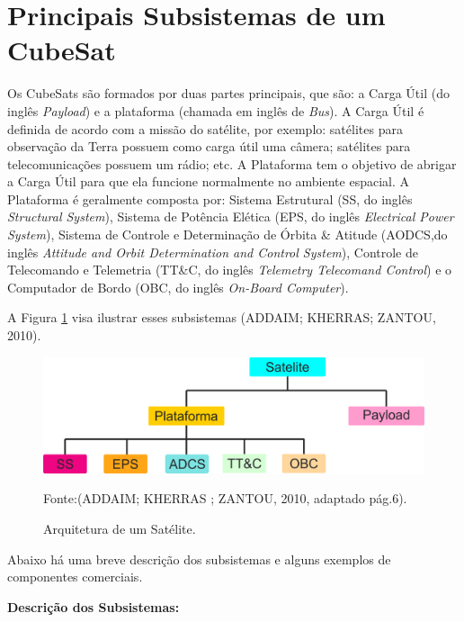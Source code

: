 \section{Principais Subsistemas de um CubeSat}

Os CubeSats são formados por duas partes principais, que são: a Carga Útil (do inglês \textit{Payload}) e a plataforma (chamada em inglês de \textit{Bus}). A Carga Útil é definida de acordo com a missão do satélite, por exemplo: satélites para observação da Terra possuem como carga útil uma câmera; satélites para telecomunicações possuem um rádio; etc. A Plataforma tem o objetivo de abrigar a Carga Útil para que ela funcione normalmente no ambiente espacial. A Plataforma é geralmente composta por: Sistema Estrutural (SS, do inglês \textit{Structural System}), Sistema de Potência Elética (EPS, do inglês \textit{Electrical Power System}), Sistema de Controle e Determinação de Órbita \& Atitude (AODCS,do inglês \textit{Attitude and Orbit Determination and Control System}), Controle de Telecomando e Telemetria (TT\&C, do inglês \textit{Telemetry Telecomand Control}) e o Computador de Bordo (OBC, do inglês \textit{On-Board Computer}). 

\newpage

A Figura \ref{fig06} visa ilustrar esses subsistemas (ADDAIM; KHERRAS; ZANTOU, 2010).

\begin{figure}[h]
	\centering
    \caption{Arquitetura de um Satélite.}
	\includegraphics[keepaspectratio=true,scale=0.57]{figuras/estrutura_satellite.png}
	
	Fonte:(ADDAIM; KHERRAS ; ZANTOU, 2010, adaptado pág.6).
	
	\label{fig06}
\end{figure}



Abaixo há uma breve descrição dos subsistemas e alguns exemplos de componentes comerciais.

\textbf{Descrição dos Subsistemas:}


